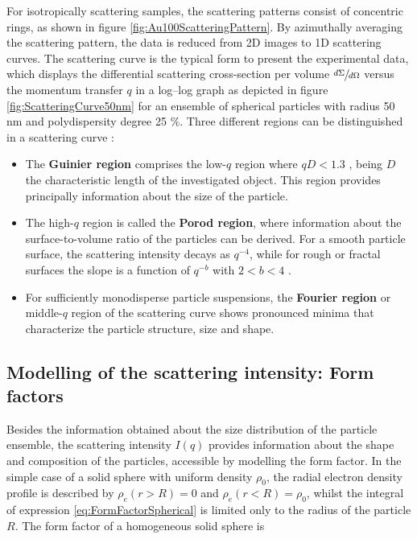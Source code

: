 For isotropically scattering samples, the scattering patterns consist of concentric rings, as shown in figure \ref{fig:Au100ScatteringPattern}. By azimuthally averaging the scattering pattern, the data is reduced from 2D images to 1D scattering curves. The scattering curve is the typical form to present the experimental data, which displays the differential scattering cross-section per volume $\sfrac{d\Sigma}{d\Omega}$ versus the momentum transfer $q$ in a log–log graph as depicted in figure \ref{fig:ScatteringCurve50nm} for an ensemble of spherical particles with radius 50 nm and polydispersity degree 25 $\%$. Three different regions can be distinguished in a scattering curve \citep{schnablegger_practical_2006}:

\begin{itemize}
        \item The \textbf{Guinier region} comprises the low-$q$ region where $qD<1.3$ \citep{feigin_structure_1987}, being $D$ the characteristic length of the investigated object. This region provides principally information about the size of the particle.
        \item The high-$q$ region is called the \textbf{Porod region}, where information about the surface-to-volume ratio of the particles can be derived. For a smooth particle surface, the scattering intensity decays as $q^{-4}$, while for rough or fractal surfaces the slope is a function of $q^{-b}$ with $2<b<4$ \citep{glatter_small_1982}.
        \item For sufficiently monodisperse particle suspensions, the \textbf{Fourier region} or middle-$q$ region of the scattering curve shows pronounced minima that characterize the particle structure, size and shape.

\end{itemize}

\subsection{Modelling of the scattering intensity: Form factors}

Besides the information obtained about the size distribution of the particle ensemble, the scattering intensity $I(q)$ provides information about the shape and composition of the particles, accessible by modelling the form factor. In the simple case of a solid sphere with uniform density $\rho_0$, the radial electron density profile is described by $\rho_e(r>R)=0$ and $\rho_e(r<R)=\rho_0$, whilst the integral of expression \ref{eq:FormFactorSpherical} is limited only to the radius of the particle $R$. The form factor of a homogeneous solid sphere is 

